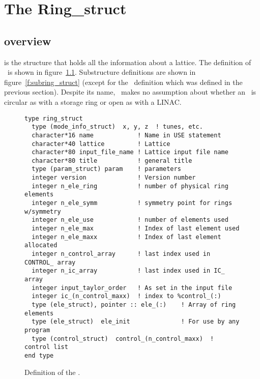 \chapter{The Ring\_struct}
\section{overview}

\ringstruct is the structure that holds all the information about a lattice.
The definition of \ringstruct\ is shown in figure~\ref{f:ring_struct}.
Substructure definitions are shown in figure~\ref{f:subring_struct} (except for the
\elestruct\ definition which was defined in the previous section). Despite its
name, \bmad\ makes no assumption about whether an \ringstruct\ is circular as
with a storage ring or open as with a LINAC.

\begin{figure}[tb]
\centering
\begin{verbatim}
type ring_struct
  type (mode_info_struct)  x, y, z  ! tunes, etc.
  character*16 name            ! Name in USE statement
  character*40 lattice         ! Lattice
  character*80 input_file_name ! Lattice input file name
  character*80 title           ! general title
  type (param_struct) param    ! parameters
  integer version              ! Version number
  integer n_ele_ring           ! number of physical ring elements
  integer n_ele_symm           ! symmetry point for rings w/symmetry
  integer n_ele_use            ! number of elements used
  integer n_ele_max            ! Index of last element used
  integer n_ele_maxx           ! Index of last element allocated
  integer n_control_array      ! last index used in CONTROL_ array
  integer n_ic_array           ! last index used in IC_ array
  integer input_taylor_order   ! As set in the input file
  integer ic_(n_control_maxx)  ! index to %control_(:)
  type (ele_struct), pointer :: ele_(:)    ! Array of ring elements
  type (ele_struct)  ele_init              ! For use by any program
  type (control_struct)  control_(n_control_maxx)  ! control list
end type
\end{verbatim}
\caption{Definition of the \ringstruct.}
\label{f:ring_struct}
\end{figure}

